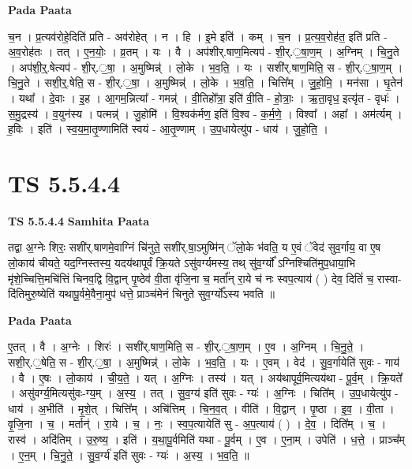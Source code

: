 \documentclass[17pt]{extarticle}
\begin{document}
\textbf{Pada Paata} \newline

च॒न । प्र॒त्यव॑रोहे॒दिति॑ प्रति - अव॑रोहेत् । न । हि । इ॒मे इति॑ । कम् । च॒न । प्र॒त्य॒व॒रोह॑त॒ इति॑ प्रति - अ॒व॒रोह॑तः । तत् । ए॒न॒योः॒ । व्र॒तम् । यः । वै । अप॑शीर्.षाण॒मित्यप॑ - शी॒र्.॒षा॒ण॒म् । अ॒ग्निम् । चि॒नु॒ते । अप॑शी॒र्॒.षेत्यप॑ - शी॒र्.॒षा॒ । अ॒मुष्मिन्न्॑ । लो॒के । भ॒व॒ति॒ । यः । सशी॑र्.षाण॒मिति॒ स - शी॒र्.॒षा॒ण॒म् । चि॒नु॒ते । सशी॒र्॒.षेति॒ स - शी॒र्.॒षा॒ । अ॒मुष्मिन्न्॑ । लो॒के । भ॒व॒ति॒ । चित्ति᳚म् । जु॒हो॒मि॒ । मन॑सा । घृ॒तेन॑ । यथा᳚ । दे॒वाः । इ॒ह । आ॒गम॒न्नित्या᳚ - गमन्न्॑ । वी॒तिहो᳚त्रा॒ इति॑ वी॒ति - हो॒त्राः॒ । ऋ॒ता॒वृध॒ इत्यृ॑त - वृधः॑ । स॒मु॒द्रस्य॑ । व॒युन॑स्य । पत्मन्न्॑ । जु॒होमि॑ । वि॒श्वक॑र्मण॒ इति॑ वि॒श्व - क॒र्म॒णे॒ । विश्वा᳚ । अहा᳚ । अम॑र्त्यम् । ह॒विः । इति॑ । स्व॒य॒मा॒तृ॒ण्णामिति॑ स्वयं - आ॒तृ॒ण्णाम् । उ॒प॒धायेत्यु॑प - धाय॑ । जु॒हो॒ति॒ ।  \newline





\section{ TS 5.5.4.4 }

\textbf{TS 5.5.4.4 } \newline
\textbf{Samhita Paata} \newline

तद्वा अ॒ग्नेः शिरः॒ सशी॑र्.षाणमे॒वाग्निं चि॑नुते॒ सशी॑र्.षा॒ऽमुष्मि॑न् ॅलो॒के भ॑वति॒ य ए॒वं ॅवेद॑ सुव॒र्गाय॒ वा ए॒ष लो॒काय॑ चीयते॒ यद॒ग्निस्तस्य॒ यदय॑थापूर्वं क्रि॒यते ऽसु॑वर्ग्यमस्य॒ तथ् सु॑व॒र्ग्यो᳚ ऽग्निश्चिति॑मुप॒धाया॒भि मृ॑शे॒च्चित्ति॒मचि॑त्तिं चिनव॒द्वि वि॒द्वान् पृ॒ष्ठेव॑ वी॒ता वृ॑जि॒ना च॒ मर्ता᳚न् रा॒ये च॑ नः स्वप॒त्याय॑ ( ) देव॒ दितिं॑ च॒ रास्वा-दि॑तिमुरु॒ष्येति॑ यथापू॒र्वमे॒वैना॒मुप॑ धत्ते॒ प्राञ्च॑मेनं चिनुते सुव॒र्ग्यो᳚ऽस्य भवति ॥ \newline

\textbf{Pada Paata} \newline

ए॒तत् । वै । अ॒ग्नेः । शिरः॑ । सशी॑र्.षाण॒मिति॒ स - शी॒र्.॒षा॒ण॒म् । ए॒व । अ॒ग्निम् । चि॒नु॒ते॒ । सशी॒र्.॒षेति॒ स - शी॒र्.॒षा॒ । अ॒मुष्मिन्न्॑ । लो॒के । भ॒व॒ति॒ । यः । ए॒वम् । वेद॑ । सु॒व॒र्गायेति॑ सुवः - गाय॑ । वै । ए॒षः । लो॒काय॑ । ची॒य॒ते॒ । यत् । अ॒ग्निः । तस्य॑ । यत् । अय॑थापूर्व॒मित्यय॑था - पू॒र्व॒म् । क्रि॒यते᳚ । असु॑वर्ग्य॒मित्यसु॑वः-ग्य॒म् । अ॒स्य॒ । तत् । सु॒व॒ग्य॑ इति॑ सुवः - ग्यः॑ । अ॒ग्निः । चिति᳚म् । उ॒प॒धायेत्यु॑प - धाय॑ । अ॒भीति॑ । मृ॒शे॒त् । चित्ति᳚म् । अचि॑त्तिम् । चि॒न॒व॒त् । वीति॑ । वि॒द्वान् । पृ॒ष्ठा । इ॒व॒ । वी॒ता । वृ॒जि॒ना । च॒ । मर्तान्॑ । रा॒ये । च॒ । नः॒ । स्व॒प॒त्यायेति॑ सु - अ॒प॒त्याय॑ ( ) । दे॒व॒ । दिति᳚म् । च॒ । रास्व॑ । अदि॑तिम् । उ॒रु॒ष्य॒ । इति॑ । य॒था॒पू॒र्वमिति॑ यथा - पू॒र्वम् । ए॒व । ए॒ना॒म् । उपेति॑ । ध॒त्ते॒ । प्राञ्च᳚म् । ए॒न॒म् । चि॒नु॒ते॒ । सु॒व॒र्ग्य॑ इति॑ सुवः - ग्यः॑ । अ॒स्य॒ । भ॒व॒ति॒ ॥  \newline
\end{document}
